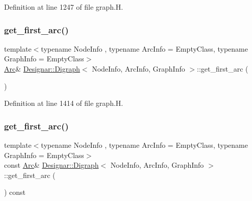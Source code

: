 Definition at line 1247 of file graph.\+H.

\mbox{\label{class_designar_1_1_digraph_af28c0708f3a09f172e4258772f56a476}} 
\subsubsection{\texorpdfstring{get\+\_\+first\+\_\+arc()}{get\_first\_arc()}\hspace{0.1cm}{\footnotesize\ttfamily [1/2]}}
{\footnotesize\ttfamily template$<$typename Node\+Info , typename Arc\+Info  = Empty\+Class, typename Graph\+Info  = Empty\+Class$>$ \\
\hyperlink{class_designar_1_1_digraph_a0ceb278671f2a535c00fddccdeafd69f}{Arc}\& \hyperlink{class_designar_1_1_digraph}{Designar\+::\+Digraph}$<$ Node\+Info, Arc\+Info, Graph\+Info $>$\+::get\+\_\+first\+\_\+arc (\begin{DoxyParamCaption}{ }\end{DoxyParamCaption})\hspace{0.3cm}{\ttfamily [inline]}}



Definition at line 1414 of file graph.\+H.

\mbox{\label{class_designar_1_1_digraph_a7842484a51df899e95a65e979d70079c}} 
\subsubsection{\texorpdfstring{get\+\_\+first\+\_\+arc()}{get\_first\_arc()}\hspace{0.1cm}{\footnotesize\ttfamily [2/2]}}
{\footnotesize\ttfamily template$<$typename Node\+Info , typename Arc\+Info  = Empty\+Class, typename Graph\+Info  = Empty\+Class$>$ \\
const \hyperlink{class_designar_1_1_digraph_a0ceb278671f2a535c00fddccdeafd69f}{Arc}\& \hyperlink{class_designar_1_1_digraph}{Designar\+::\+Digraph}$<$ Node\+Info, Arc\+Info, Graph\+Info $>$\+::get\+\_\+first\+\_\+arc (\begin{DoxyParamCaption}{ }\end{DoxyParamCaption}) const\hspace{0.3cm}{\ttfamily [inline]}}



